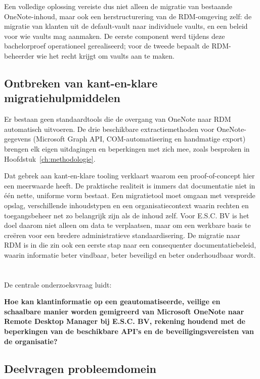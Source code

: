 Een volledige oplossing vereiste dus niet alleen de migratie van bestaande OneNote-inhoud, maar ook een herstructurering van de RDM-omgeving zelf: de migratie van klanten uit de default-vault naar individuele vaults, en een beleid voor wie vaults mag aanmaken. De eerste component werd tijdens deze bachelorproef operationeel gerealiseerd; voor de tweede bepaalt de RDM-beheerder wie het recht krijgt om vaults aan te maken.

\subsection{Ontbreken van kant-en-klare migratiehulpmiddelen}

Er bestaan geen standaardtools die de overgang van OneNote naar RDM automatisch uitvoeren. De drie beschikbare extractiemethoden voor OneNote-gegevens (Microsoft Graph API, COM-automatisering en handmatige export) brengen elk eigen uitdagingen en beperkingen met zich mee, zoals besproken in Hoofdstuk~\ref{ch:methodologie}.

Dat gebrek aan kant-en-klare tooling verklaart waarom een proof-of-concept hier een meerwaarde heeft. De praktische realiteit is immers dat documentatie niet in één nette, uniforme vorm bestaat. Een migratietool moet omgaan met verspreide opslag, verschillende inhoudstypen en een organisatiecontext waarin rechten en toegangsbeheer net zo belangrijk zijn als de inhoud zelf. Voor E.S.C. BV is het doel daarom niet alleen om data te verplaatsen, maar om een werkbare basis te creëren voor een bredere administratieve standaardisering. De migratie naar RDM is in die zin ook een eerste stap naar een consequenter documentatiebeleid, waarin informatie beter vindbaar, beter beveiligd en beter onderhoudbaar wordt.

\section{}%
\label{sec:onderzoeksvraag}

De centrale onderzoeksvraag luidt:

\textbf{Hoe kan klantinformatie op een geautomatiseerde, veilige en schaalbare manier worden gemigreerd van Microsoft OneNote naar Remote Desktop Manager bij E.S.C. BV, rekening houdend met de beperkingen van de beschikbare API's en de beveiligingsvereisten van de organisatie?}

\subsection{Deelvragen probleemdomein}

